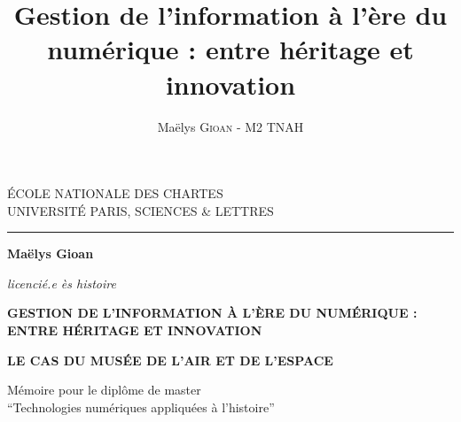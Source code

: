 \documentclass[12pt,twoside]{book}
\author{Maëlys \textsc{Gioan} - M2 TNAH}
\title{Gestion de l’information à l’ère du numérique : entre héritage et innovation}
\begin{document}
	\begin{titlepage}
		\begin{center}
			
			\bigskip
			
			\begin{large}				
				ÉCOLE NATIONALE DES CHARTES\\
				UNIVERSITÉ PARIS, SCIENCES \& LETTRES
			\end{large}
			\begin{center}\rule{2cm}{0.02cm}\end{center}
			
			\bigskip
			\bigskip
			\bigskip
			\begin{Large}
				\textbf{Maëlys Gioan}\\
			\end{Large}
			\begin{normalsize} \textit{licencié.e ès histoire}\\
			\end{normalsize}
			
			\bigskip
			\bigskip
			\bigskip
			
			\begin{Huge}
				\MakeUppercase{\textbf{Gestion de l’information à l’ère du numérique : entre héritage et innovation}}\\
			\end{Huge}
			\bigskip
			\bigskip
			\begin{LARGE}
				\MakeUppercase{\textbf{Le cas du Musée de l’Air et de l’Espace}}\\
			\end{LARGE}
			
			\bigskip
			\bigskip
			\bigskip
			\begin{large}
			\end{large}
			\vfill
			
			\begin{large}
				Mémoire 
				pour le diplôme de master \\
				\enquote{Technologies numériques appliquées à l'histoire} \\
			\end{large}
			
		\end{center}
	\end{titlepage}

	\thispagestyle{empty}	
	\cleardoublepage
	
\frontmatter
\end{document}
